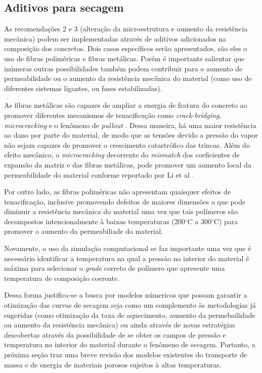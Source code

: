 \subsection{Aditivos para secagem}
As recomendações 2 e 3 (alteração da microestrutura e aumento da resistência
mecânica) podem ser implementadas através de aditivos adicionados na composição
dos concretos. Dois casos específicos serão apresentados, são eles o uso de
fibras poliméricas e fibras metálicas. Porém é importante salientar que inúmeras
outras possibilidades também podem contribuir para o aumento de permeabilidade
ou o aumento da resistência mecânica do material (como uso de diferentes
sistemas ligantes, ou fases estabilizadas).

As fibras metálicas são capazes de ampliar a energia de fratura do concreto ao
promover diferentes mecanismos de tenacificação como {\it crack-bridging}, {\it
  microcracking} e o fenômeno de {\it pullout} \cite{da2015refractory}. Dessa
maneira, há uma maior resistência ao dano por parte do material, de modo que as
tensões devido a pressão do vapor não sejam capazes de promover o crescimento
catastrófico das trincas. Além do efeito mecânico, o {\it microcracking}
decorrente do {\it mismatch} dos coeficientes de expansão da matriz e das fibras
metálicas, pode promover um aumento local da permeabilidade do material conforme
reportado por Li et al \cite{li2019}.

Por outro lado, as fibras poliméricas não apresentam quaisquer efeitos de
tenacificação, inclusive promovendo defeitos de maiores dimensões o que pode
diminuir a resistência mecânica do material uma vez que tais polímeros são
decompostos intencionalmente à baixas temperaturas (200$^\circ$C a 300$^\circ$C)
para promover o aumento da permeabiliade do material.

Novamente, o uso da simulação computacional se faz importante uma vez que é
necessário identificar a temperatura na qual a pressão no interior do material é
máxima para selecionar o {\it grade} correto de polímero que apresente uma
temperatura de composição coerente.

Dessa forma justifica-se a busca por modelos númericos que possam garantir a
otimização das curvas de secagem seja como um complemento às metodologias já
sugeridas (como otimização da taxa de aquecimento, aumento da permebailidade ou
aumento da resistência mecânica) ou ainda através de novas estratégias
descobertas através da possibilidade de se obter os campos de pressão e
temperatura no interior do material durante o fenômeno de secagem. Portanto, a
próxima seção traz uma breve revisão dos modelos existentes do transporte de
massa e de energia de materiais porosos sujeitos à altas temperaturas.
     
        
